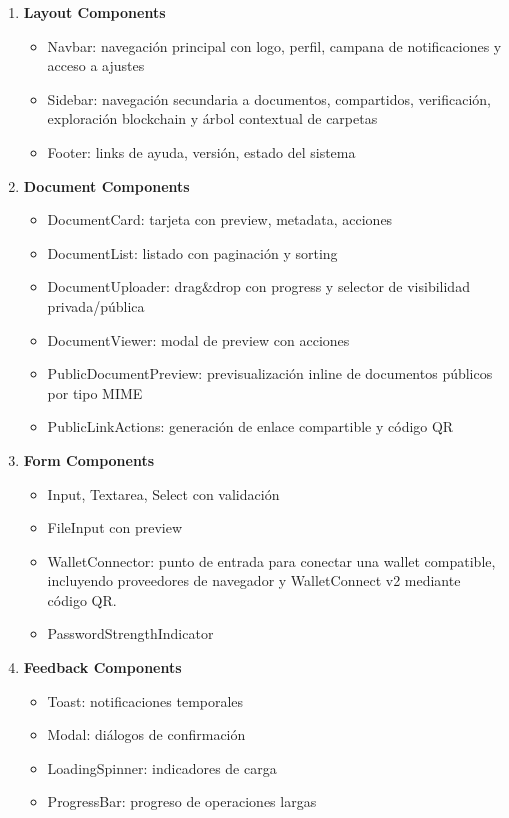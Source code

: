 \documentclass[11pt, a4paper]{article}
\begin{document}
\begin{enumerate}
    \item \textbf{Layout Components}
    \begin{itemize}
        \item Navbar: navegación principal con logo, perfil, campana de notificaciones y acceso a ajustes
        \item Sidebar: navegación secundaria a documentos, compartidos, verificación, exploración blockchain y árbol contextual de carpetas
        \item Footer: links de ayuda, versión, estado del sistema
    \end{itemize}
    
    \item \textbf{Document Components}
    \begin{itemize}
        \item DocumentCard: tarjeta con preview, metadata, acciones
        \item DocumentList: listado con paginación y sorting
        \item DocumentUploader: drag\&drop con progress y selector de visibilidad privada/pública
        \item DocumentViewer: modal de preview con acciones
        \item PublicDocumentPreview: previsualización inline de documentos públicos por tipo MIME
        \item PublicLinkActions: generación de enlace compartible y código QR
    \end{itemize}
    
    \item \textbf{Form Components}
    \begin{itemize}
        \item Input, Textarea, Select con validación
        \item FileInput con preview
        \item WalletConnector: punto de entrada para conectar una wallet compatible, incluyendo proveedores de navegador y WalletConnect v2 mediante código QR.
        \item PasswordStrengthIndicator
    \end{itemize}
    
    \item \textbf{Feedback Components}
    \begin{itemize}
        \item Toast: notificaciones temporales
        \item Modal: diálogos de confirmación
        \item LoadingSpinner: indicadores de carga
        \item ProgressBar: progreso de operaciones largas
    \end{itemize}
\end{enumerate}
\end{document}
